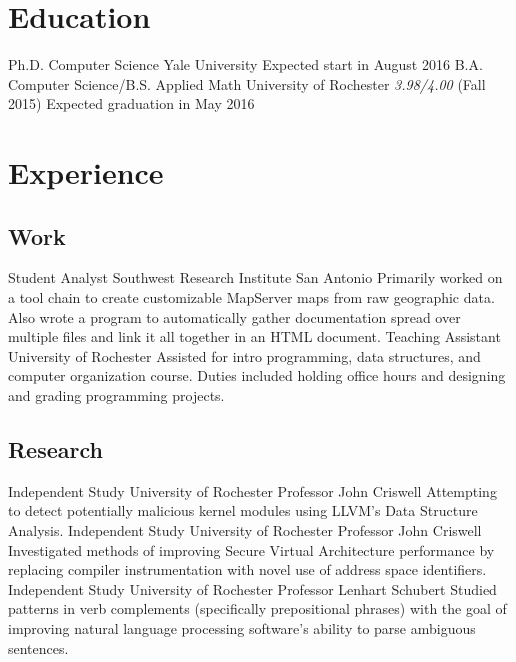 \documentclass[10pt, letterpaper, sans]{moderncv}
\begin{document}
\makecvtitle

\section{Education}
		{Ph.D. Computer Science}
        {Yale University}
        {}
        {}
        {Expected start in August 2016}
	    {B.A. Computer Science/B.S. Applied Math}
        {University of Rochester}
        {} %
        {\textit{3.98/4.00} (Fall 2015)}
        {Expected graduation in May 2016}

\section{Experience}
\subsection{Work}
		{Student Analyst}
        {Southwest Research Institute}
        {San Antonio}
        {}
        {Primarily worked on a tool chain to create customizable MapServer maps
        from raw geographic data. Also wrote a program to automatically gather
        documentation spread over multiple files and link it all together in an
        HTML document.}
		{Teaching Assistant}
        {University of Rochester}
        {}
        {}
        {Assisted for intro programming, data structures, and computer
        organization course. Duties included holding office hours and designing
        and grading programming projects.}

\subsection{Research}
		{Independent Study}
        {University of Rochester}
        {Professor John Criswell}
        {}
        {Attempting to detect potentially malicious kernel modules using LLVM's
        Data Structure Analysis.}
		{Independent Study}
        {University of Rochester}
        {Professor John Criswell}
        {}
        {Investigated methods of improving Secure Virtual Architecture
        performance by replacing compiler instrumentation with novel use of
        address space identifiers.}
		{Independent Study}
        {University of Rochester}
        {Professor Lenhart Schubert}
        {}
        {Studied patterns in verb complements (specifically prepositional
        phrases) with the goal of improving natural language processing
        software’s ability to parse ambiguous sentences.}
\end{document}
